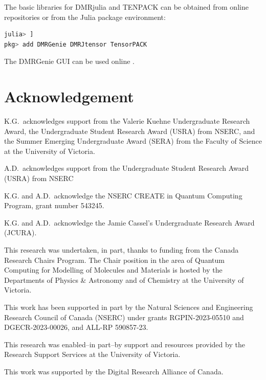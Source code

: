 \documentclass{juliacon}
\begin{document}
The basic libraries for DMRjulia and TENPACK can be obtained from online repositories \cite{dmrjulia,tenpack} or from the Julia package environment:
\begin{lstlisting}[language = Julia]
julia> ]
pkg> add DMRGenie DMRJtensor TensorPACK
\end{lstlisting}

The DMRGenie GUI can be used online \cite{dmrgenie}.

\section{Acknowledgement}

K.G.~acknowledges support from the Valerie Kuehne Undergraduate Research Award, the Undergraduate Student Research Award (USRA) from NSERC, and the Summer Emerging Undergraduate Award (SERA) from the Faculty of Science at the University of Victoria. 

A.D.~acknowledges support from the Undergraduate Student Research Award (USRA) from NSERC

K.G. and A.D.~acknowledge the NSERC CREATE in Quantum Computing Program, grant number 543245.

K.G. and A.D.~acknowledge the Jamie Cassel's Undergraduate Research Award (JCURA).

This research was undertaken, in part, thanks to funding from the Canada Research Chairs Program. The Chair position in the area of Quantum Computing for Modelling of Molecules and Materials is hosted by the Departments of Physics \& Astronomy and of Chemistry at the University of Victoria. 

This work has been supported in part by the Natural Sciences and Engineering Research Council of Canada (NSERC) under grants RGPIN-2023-05510 and DGECR-2023-00026, and ALL-RP 590857-23.

This research was enabled--in part--by support and resources provided by the Research Support Services at the University of Victoria.

This work was supported by the Digital Research Alliance of Canada.



\end{document}
